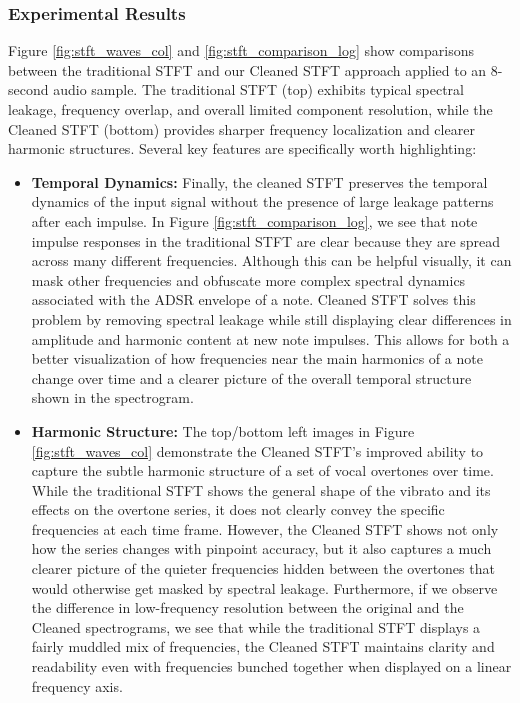 \documentclass[11pt,twoside]{report}
\numberwithin{thm}{section}
\numberwithin{equation}{section}
\begin{document}
\subsubsection{Experimental Results}

Figure \ref{fig:stft_waves_col} and \ref{fig:stft_comparison_log} show comparisons between the traditional STFT and our Cleaned STFT approach applied to an 8-second audio sample. The traditional STFT (top) exhibits typical spectral leakage, frequency overlap, and overall limited component resolution, while the Cleaned STFT (bottom) provides sharper frequency localization and clearer harmonic structures. 
\clearpage
Several key features are specifically worth highlighting:
\begin{itemize}
 \item \textbf{Temporal Dynamics: } Finally, the cleaned STFT preserves the temporal dynamics of the input signal without the presence of large leakage patterns after each impulse. In Figure \ref{fig:stft_comparison_log}, we see that note impulse responses in the traditional STFT are clear because they are spread across many different frequencies. Although this can be helpful visually, it can mask other frequencies and obfuscate more complex spectral dynamics associated with the ADSR envelope of a note. Cleaned STFT solves this problem by removing spectral leakage while still displaying clear differences in amplitude and harmonic content at new note impulses. This allows for both a better visualization of how frequencies near the main harmonics of a note change over time and a clearer picture of the overall temporal structure shown in the spectrogram.  
 
\item \textbf{Harmonic Structure: } The top/bottom left images in Figure \ref{fig:stft_waves_col} demonstrate the Cleaned STFT's improved ability to capture the subtle harmonic structure of a set of vocal overtones over time. While the traditional STFT shows the general shape of the vibrato and its effects on the overtone series, it does not clearly convey the specific frequencies at each time frame. However, the Cleaned STFT shows not only how the series changes with pinpoint accuracy, but it also captures a much clearer picture of the quieter frequencies hidden between the overtones that would otherwise get masked by spectral leakage. Furthermore, if we observe the difference in low-frequency resolution between the original and the Cleaned spectrograms, we see that while the traditional STFT displays a fairly muddled mix of frequencies, the Cleaned STFT maintains clarity and readability even with frequencies bunched together when displayed on a linear frequency axis. 
    

\end{itemize}
\end{document}

